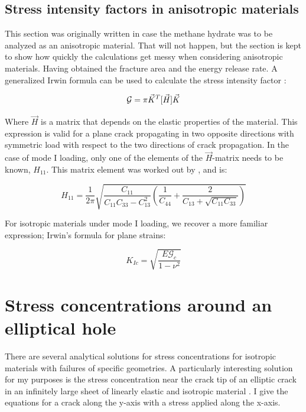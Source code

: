 \subsection{Stress intensity factors in anisotropic materials}
This section was originally written in case the methane hydrate was to be analyzed as an anisotropic material. That will not happen, but the section is kept to show how quickly the calculations get messy when considering anisotropic materials. Having obtained the fracture area and the energy release rate. A generalized Irwin formula can be used to calculate the stress intensity factor \cite{Laubie2014}:

\begin{equation}
	\mathbf{\mathcal{G}} = \pi \vec{K}^T [\vec{H}] \vec{K} 
\end{equation}


Where $\vec{H}$ is a matrix that depends on the elastic properties of the material. This expression is valid for a plane crack propagating in two opposite directions with symmetric load with respect to the two directions of crack propagation. In the case of mode I loading, only one of the elements of the $\vec{H}$-matrix needs to be known, $H_{11}$. This matrix element was worked out by \citet{Laubie2014}, and is:

\begin{equation}
	H_{11} = \frac{1}{2\pi} \sqrt{\frac{C_{11}}{C_{11}C_{33}-C^2_{13}}\left( \frac{1}{C_{44}} + \frac{2}{C_{13} + \sqrt{C_{11} C_{33}}}\right)}
\end{equation}

For isotropic materials under mode I loading, we recover a more familiar expression; Irwin's formula for plane strains:

\begin{equation}
	K_{Ic} = \sqrt{\frac{E\mathcal{G}_{c}}{1-\nu^2}}
	\label{eq:energy_release_to_stress_intensity_isotropic}
\end{equation}



\section{Stress concentrations around an elliptical hole}
There are several analytical solutions for stress concentrations for isotropic materials with failures of specific geometries. A particularly interesting solution for my purposes is the stress concentration near the crack tip of an elliptic crack in an infinitely large sheet of linearly elastic and isotropic material \cite{Anderson2005}. I give the equations for a crack along the y-axis with a stress applied along the x-axis.

